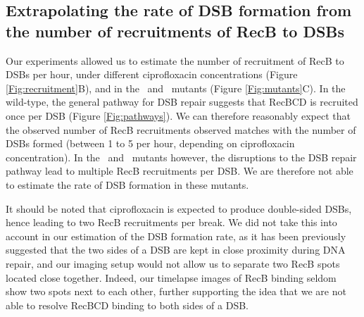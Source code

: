 \subsection*{Extrapolating the rate of DSB formation from the number of recruitments of RecB to DSBs}
Our experiments allowed us to estimate the number of recruitment of RecB to DSBs per hour, under different ciprofloxacin concentrations (Figure \ref{Fig:recruitment}B), and in the \dreca\ and \geneteneighty\ mutants (Figure \ref{Fig:mutants}C). In the wild-type, the general pathway for DSB repair suggests that RecBCD is recruited once per DSB (Figure \ref{Fig:pathways}). We can therefore reasonably expect that the observed number of RecB recruitments observed matches with the number of DSBs formed (between 1 to 5 per hour, depending on ciprofloxacin concentration). In the \dreca\ and \geneteneighty\ mutants however, the disruptions to the DSB repair pathway lead to multiple RecB recruitments per DSB. We are therefore not able to estimate the rate of DSB formation in these mutants.

It should be noted that ciprofloxacin is expected to produce double-sided DSBs, hence leading to two RecB recruitments per break. We did not take this into account in our estimation of the DSB formation rate, as it has been previously suggested that the two sides of a DSB are kept in close proximity during DNA repair\cite{Vickridge2017,Keyamura2019}, and our imaging setup would not allow us to separate two RecB spots located close together. Indeed, our timelapse images of RecB binding seldom show two spots next to each other, further supporting the idea that we are not able to resolve RecBCD binding to both sides of a DSB.
